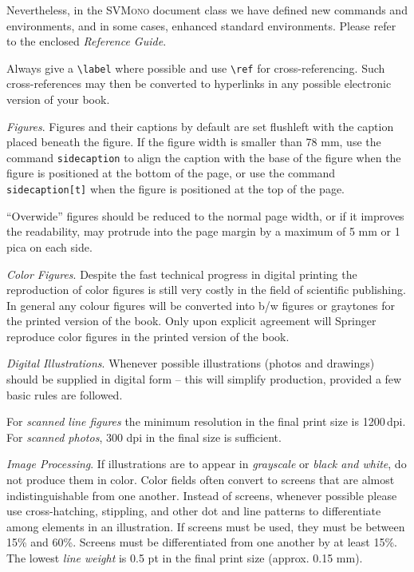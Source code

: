 \documentclass[graybox]{svmono}
\begin{document}
Nevertheless, in the \textsc{SVMono} document class we have defined new commands and environments, and in some cases, enhanced standard environments. Please refer to the enclosed \emph{Reference Guide}.

Always give a \verb|\label| where possible and use \verb|\ref| for cross-referencing. Such cross-references may then be converted to hyperlinks in any possible electronic version of your book.

\textit{Figures}. Figures and their captions by default are set flushleft with the caption placed beneath the figure. If the figure width is smaller than 78 mm, use the command \texttt{sidecaption} to align the caption with the base of the figure when the figure is positioned at the bottom of the page, or use the command \texttt{sidecaption[t]} when the figure is positioned at the top of the page.

``Overwide'' figures should be reduced to the normal page width, or if it improves the readability, may protrude into the page margin by a maximum of 5 mm or 1 pica on each side.

\emph{Color Figures}. Despite the fast technical progress in digital printing the reproduction of color figures is still very costly in the field of scientific publishing. In general any colour figures will be converted into b/w figures or graytones for the printed version of the book. Only upon explicit agreement will Springer reproduce color figures in the printed version of the book.

\emph{Digital Illustrations}. Whenever possible illustrations (photos and drawings) should be supplied in digital form -- this will simplify production, provided a few basic rules are followed.

For \emph{scanned line figures} the minimum resolution in the final print size is 1200\,dpi. For \emph{scanned photos}, 300 dpi in the final size is sufficient.

\emph{Image Processing}. If illustrations are to appear in \textit{grayscale} or \textit{black and white}, do not produce them in color. Color fields often convert to screens that are almost indistinguishable from one another. Instead of screens, whenever possible please use cross-hatching, stippling, and other dot and line patterns to differentiate among elements in an illustration. If screens must be used, they must be between 15\% and 60\%. Screens must be differentiated from one another by at least 15\%. The lowest \emph{line weight} is 0.5 pt in the final print size (approx. 0.15 mm).
\end{document}
